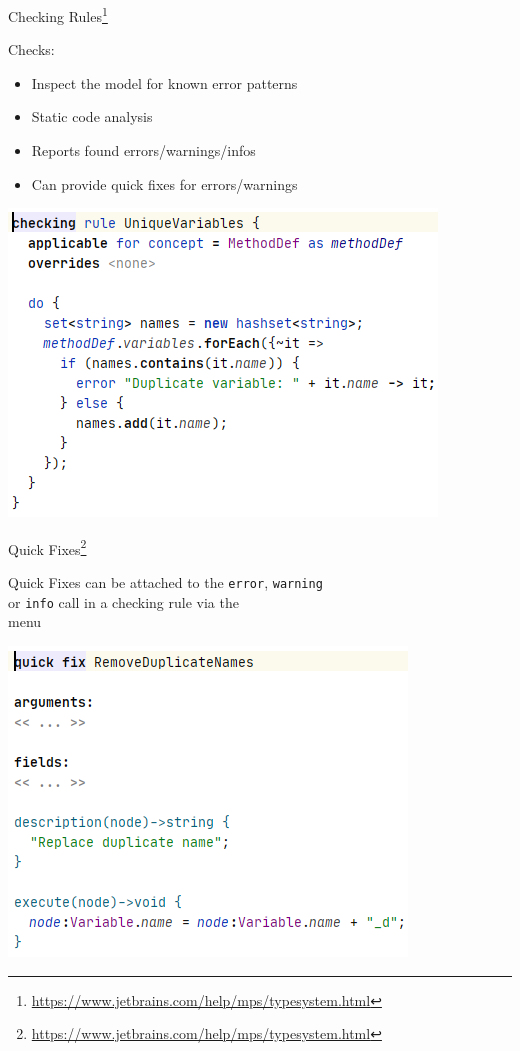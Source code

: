 	\begin{frame}{Checking Rules\footnote{\url{https://www.jetbrains.com/help/mps/typesystem.html}}}
		\begin{minipage}{0.52\textwidth}
			Checks:
			\begin{itemize}
				\item Inspect the model for known error patterns
				\item Static code analysis
				\item Reports found errors/warnings/infos
				\item Can provide quick fixes for errors/warnings
			\end{itemize}
		\end{minipage}
		\begin{minipage}{0.4\textwidth}
			\includegraphics[height=0.8\textheight]{illustrations/check.png}
		\end{minipage}
	\end{frame}

	\begin{frame}{Quick Fixes\footnote{\url{https://www.jetbrains.com/help/mps/typesystem.html}}}
		\begin{minipage}{0.52\textwidth}
			Quick Fixes can be attached to the \texttt{error}, \texttt{warning}\\
			or \texttt{info} call in a checking rule via the \\
			\menu{\workshopinspector{}} menu
		\end{minipage}
		\begin{minipage}{0.4\textwidth}
			\includegraphics[height=0.8\textheight]{illustrations/quickfix.png}
		\end{minipage}
	\end{frame}

